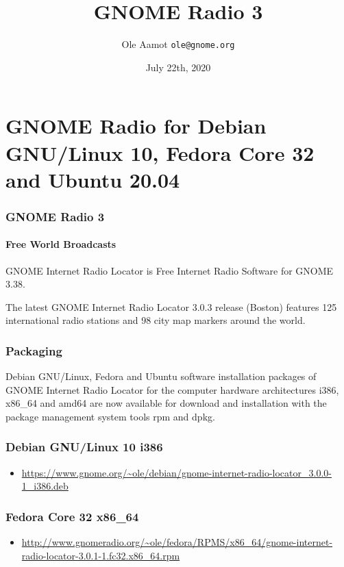 \documentclass[aspectratio=43]{beamer}
\title[GNOME Radio 3]{GNOME Radio 3}
\author{Ole Aamot \texttt{ole@gnome.org}}
\date{July 22th, 2020}
\begin{document}
\begin{frame}
\titlepage
\end{frame}

\section{GNOME Radio for Debian GNU/Linux 10, Fedora Core 32 and Ubuntu 20.04}

\begin{frame}[containsverbatim]
\frametitle{GNOME Radio 3}
\framesubtitle{Free World Broadcasts}

GNOME Internet Radio Locator is Free Internet Radio Software for GNOME 3.38.

The latest GNOME Internet Radio Locator 3.0.3 release (Boston) features 125
international radio stations and 98 city map markers around the world.

\end{frame}

\begin{frame}
\frametitle{Packaging}

Debian GNU/Linux, Fedora and Ubuntu software installation packages of
GNOME Internet Radio Locator for the computer hardware architectures
i386, x86\_64 and amd64 are now available for download and installation
with the package management system tools rpm and dpkg.

\end{frame}

\begin{frame}
\frametitle{Debian GNU/Linux 10 i386}

    \begin{itemize}
        \item \url{https://www.gnome.org/~ole/debian/gnome-internet-radio-locator_3.0.0-1_i386.deb}
    \end{itemize}

\end{frame}

\begin{frame}
\frametitle{Fedora Core 32 x86\_64}

    \begin{itemize}
        \item \url{http://www.gnomeradio.org/~ole/fedora/RPMS/x86\_64/gnome-internet-radio-locator-3.0.1-1.fc32.x86\_64.rpm}
    \end{itemize}

\end{frame}
\end{document}
